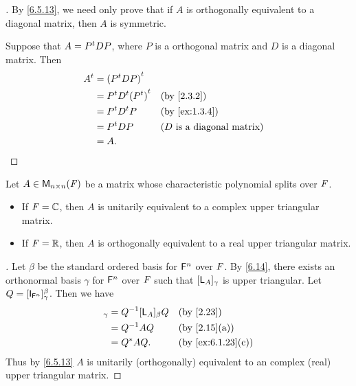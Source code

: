 \begin{proof}[]
	By \cref{6.5.13}, we need only prove that if \(A\) is orthogonally equivalent to a diagonal matrix, then \(A\) is symmetric.

	Suppose that \(A = {P}^{t} D P\), where \(P\) is a orthogonal matrix and \(D\) is a diagonal matrix.
	Then
	\begin{align*}
		\tp{A} & = \tp{(\tp{P} D P)}                                                    \\
		       & = \tp{P} \tp{D} \tp{(\tp{P})} &  & \by{2.3.2}                          \\
		       & = \tp{P} \tp{D} P             &  & \by{ex:1.3.4}                       \\
		       & = \tp{P} D P                  &  & \text{(\(D\) is a diagonal matrix)} \\
		       & = A.
	\end{align*}
\end{proof}

\begin{thm}\label{6.21}
	Let \(A \in \ms[n][n][\F]\) be a matrix whose characteristic polynomial splits over \(\mathit{F}\).
	\begin{itemize}
		\item If \(\mathit{F} = \mathbb{C}\), then \(A\) is unitarily equivalent to a complex upper triangular matrix.
		\item If \(\mathit{F} = \mathbb{R}\), then \(A\) is orthogonally equivalent to a real upper triangular matrix.
	\end{itemize}
\end{thm}

\begin{proof}[]
	Let \(\beta\) be the standard ordered basis for \(\mathsf{F}^n\) over \(\mathit{F}\).
	By \cref{6.14}, there exists an orthonormal basis \(\gamma\) for \(\mathsf{F}^n\) over \(\mathit{F}\) such that \([\mathsf{L}_A]_{\gamma}\) is upper triangular.
	Let \(Q = [\IT[\vs{F}^n]]_{\gamma}^{\beta}\).
	Then we have
	\begin{align*}
		[\L_A]_{\gamma} & = Q^{-1} [\L_A]_{\beta} Q &  & \by{2.23}         \\
		                & = Q^{-1} A Q              &  & \by{2.15}[a]      \\
		                & = Q^* A Q.                &  & \by{ex:6.1.23}[c]
	\end{align*}
	Thus by \cref{6.5.13} \(A\) is unitarily (orthogonally) equivalent to an complex (real) upper triangular matrix.
\end{proof}

